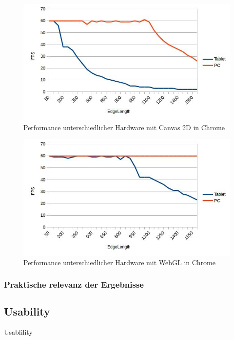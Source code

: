 \begin{figure}[pt]
	\centering
	\includegraphics[width=0.7\linewidth]{img/c4_stat_hardware_js_chrome.jpg}
	\caption{Performance unterschiedlicher Hardware mit Canvas 2D in Chrome}
	\label{fig:stat_hardware_js_chrome}
\end{figure}

\begin{figure}[pt]
	\centering
	\includegraphics[width=0.7\linewidth]{img/c4_stat_hardware_webgl_chrome.jpg}
	\caption{Performance unterschiedlicher Hardware mit WebGL in Chrome}
	\label{fig:stat_hardware_webgl_chrome}
\end{figure}

\subsubsection{Praktische relevanz der Ergebnisse}

\subsection{Usability}
\label{sec:Usability}
Usablility
